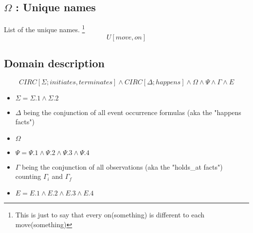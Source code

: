 \iffalse
Agents cannot switch places
\begin{multline}
  \tag{$\Psi$.4}
  [holds\_at(on(r,v),t)\ \land\ holds\_at(on(r',v'),t)\ \land\ holds\_at(on(r',v),t+1) \\ \land\ v\neq v'\ \land\ r\neq r'] \Rightarrow \neg holds\_at(on(r,v'),t+1)
\end{multline}
\fi

\subsection{$\Omega$ : Unique names}

List of the unique names. \footnote{This is just to say that every on(something) is different to each move(something)}
\begin{equation}
  \tag{$\Omega$}
  U[move,on]
\end{equation}

\subsection{Domain description}

\begin{equation}
  \tag{$\Phi$}
  CIRC[\Sigma;initiates,terminates] \land CIRC[\Delta;happens] \land \Omega \land \Psi \land \Gamma \land E
\end{equation}
\begin{itemize}
  \item $\Sigma = \Sigma.1 \land \Sigma.2$
  \item $\Delta$ being the conjunction of all event occurrence formulas (aka the "happens facts")
  \item $\Omega$
  \item $\Psi = \Psi .1 \land \Psi .2 \land \Psi .3 \land \Psi .4$
  \item $\Gamma$ being the conjunction of all observations (aka the "holds\_at facts") counting $\Gamma_i$ and $\Gamma_f$
  \item $E = E.1 \land E.2 \land E.3 \land E.4$
\end{itemize}
